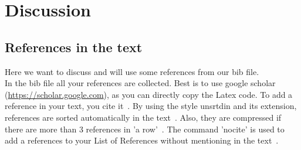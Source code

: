 \clearpage

\chapter{\textbf{Discussion}}\label{discussion}
\section{References in the text}
Here we want to discuss and will use some references from our bib file. \\
In the bib file all your references are collected. Best is to use google scholar (\url{https://scholar.google.com}), as you can directly copy the Latex code. To add a reference in your text, you cite it~\cite{Amini12}. By using the style unsrtdin and its extension, references are sorted automatically in the text~\cite{Amini12,Bajpai12}. Also, they are compressed if there are more than 3 references in 'a row'~\cite{Carpenter79,Davis11,Eurotransplant17,Falcone93}. The command 'nocite' is used to add a references to your List of References without mentioning in the text~\nocite{website:chick}.

